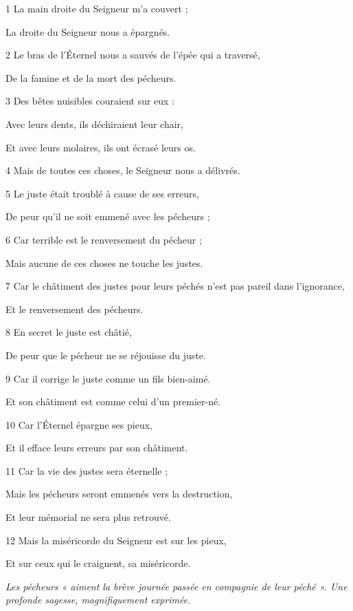 \par 1 La main droite du Seigneur m'a couvert ;
\par     La droite du Seigneur nous a épargnés.
\par 2 Le bras de l'Éternel nous a sauvés de l'épée qui a traversé,
\par     De la famine et de la mort des pécheurs.
\par 3 Des bêtes nuisibles couraient sur eux :
\par     Avec leurs dents, ils déchiraient leur chair,
\par     Et avec leurs molaires, ils ont écrasé leurs os.
\par 4 Mais de toutes ces choses, le Seigneur nous a délivrés.
\par 5 Le juste était troublé à cause de ses erreurs,
\par     De peur qu'il ne soit emmené avec les pécheurs ;
\par 6 Car terrible est le renversement du pécheur ;
\par     Mais aucune de ces choses ne touche les justes.
\par 7 Car le châtiment des justes pour leurs péchés n'est pas pareil dans l'ignorance,
\par     Et le renversement des pécheurs.
\par 8 En secret le juste est châtié,
\par     De peur que le pécheur ne se réjouisse du juste.
\par 9 Car il corrige le juste comme un fils bien-aimé.
\par     Et son châtiment est comme celui d'un premier-né.
\par 10 Car l'Éternel épargne ses pieux,
\par     Et il efface leurs erreurs par son châtiment.
\par 11 Car la vie des justes sera éternelle ;
\par     Mais les pécheurs seront emmenés vers la destruction,
\par     Et leur mémorial ne sera plus retrouvé.
\par 12 Mais la miséricorde du Seigneur est sur les pieux,
\par     Et sur ceux qui le craignent, sa miséricorde.




\par \textit{Les pécheurs « aiment la brève journée passée en compagnie de leur péché ». Une profonde sagesse, magnifiquement exprimée.}

